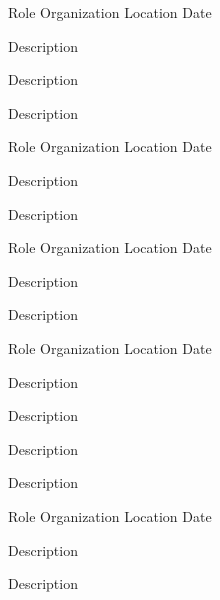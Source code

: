 

\begin{cventries}

  \cventry
    {Role} %
    {Organization} %
    {Location} %
    {Date} %
    {
      \begin{cvitems} %
        \item {Description}
        \item {Description}
        \item {Description}
      \end{cvitems}
    }

  \cventry
    {Role} %
    {Organization} %
    {Location} %
    {Date} %
    {
      \begin{cvitems} %
        \item {Description}
        \item {Description}
      \end{cvitems}
    }

  \cventry
    {Role} %
    {Organization} %
    {Location} %
    {Date} %
    {
      \begin{cvitems} %
        \item {Description}
        \item {Description}
      \end{cvitems}
    }

  \cventry
    {Role} %
    {Organization} %
    {Location} %
    {Date} %
    {
      \begin{cvitems} %
        \item {Description}
        \item {Description}
        \item {Description}
        \item {Description}
      \end{cvitems}
    }

  \cventry
    {Role} %
    {Organization} %
    {Location} %
    {Date} %
    {
      \begin{cvitems} %
        \item {Description}
        \item {Description}
      \end{cvitems}
    }

\end{cventries}
